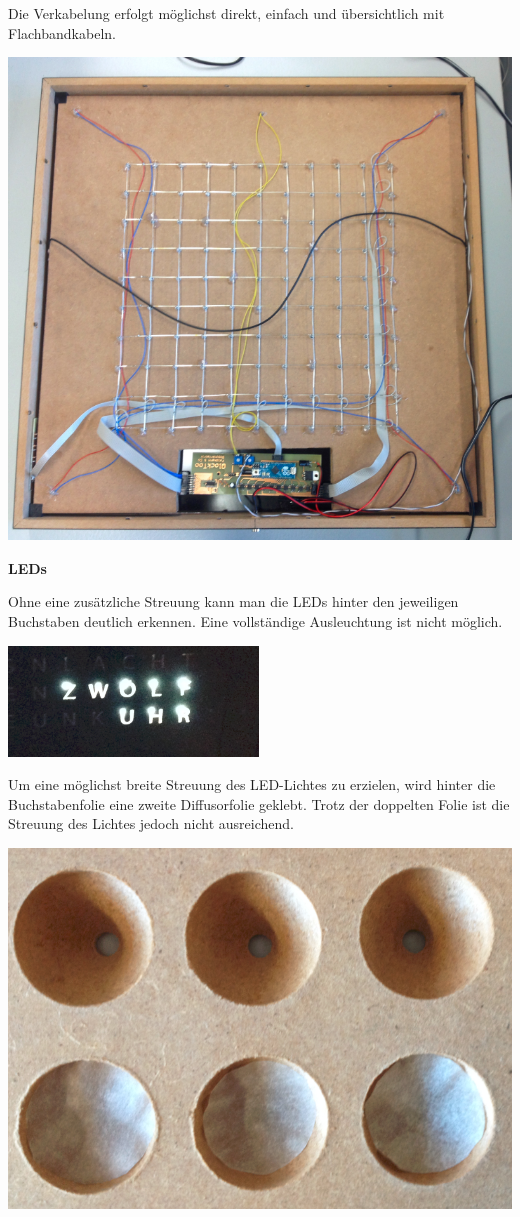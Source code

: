 \begin{multicols}{2}
{}
Die Verkabelung erfolgt möglichst direkt, einfach und übersichtlich mit Flachbandkabeln.

{
\centering
\includegraphics[width=0.85\columnwidth]{Abbildungen/Konstruktion/Platte04}

}

\textbf{LEDs}

Ohne eine zusätzliche Streuung kann man die LEDs hinter den jeweiligen Buchstaben deutlich erkennen. Eine vollständige Ausleuchtung ist nicht möglich.

{
\centering
\includegraphics[width=0.85\columnwidth]{Abbildungen/Konstruktion/LED03}

}
Um eine möglichst breite Streuung des LED-Lichtes zu erzielen, wird hinter die Buchstabenfolie eine zweite Diffusorfolie  geklebt. Trotz der doppelten Folie ist die Streuung des Lichtes jedoch nicht ausreichend.

{
\centering
\includegraphics[width=0.5\columnwidth]{Abbildungen/Konstruktion/Diffusor01}

}
\end{multicols}
